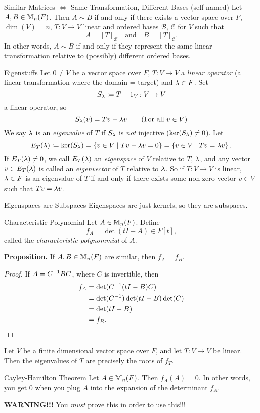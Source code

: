 \documentclass[class=article, crop=false]{standalone}
\begin{document}
  \begin{theorem}{Similar Matrices $\iff$ Same Transformation, Different Bases (self-named)}
    Let $A, B\in \mathbb{M}_n(F)$. Then $A\sim B$ if and only if there exists a vector space over $F$, $\dim(V) = n$, $T\colon V\to V$ linear and ordered bases $\mathcal{B}$, $\mathcal{C}$ for $V$ such that
    \[
      A = [T]_{\mathcal{B}}\quad \text{and} \quad B = [T]_{\mathcal{C}}.
    \]
    In other words, $A\sim B$ if and only if they represent the same linear transformation relative to (possibly) different ordered bases.
  \end{theorem}
  \begin{definition}{Eigenstuffs}
    Let $0\neq V$ be a vector space over $F$, $T\colon V\to V$ a \emph{linear operator} (a linear transformation where the domain = target) and $\lambda\in F$. Set
    \[
      S_{\lambda}\coloneqq T - 1_V\colon V\to V
    \]
    a linear operator, so
    \[
      S_{\lambda}(v) = Tv - \lambda v \tag{For all $v\in V$}
    \]
    We say $\lambda$ is an \emph{eigenvalue} of $T$ if $S_{\lambda}$ is \emph{not} injective ($\ker(S_{\lambda})\neq 0$).
    Let
    \[
      E_T(\lambda)\coloneqq \ker(S_{\lambda}) = \left\{v\in V\mid Tv - \lambda v = 0\right\} = \left\{v\in V\mid Tv = \lambda v\right\}.
    \]
    If $E_T(\lambda)\neq 0$, we call $E_T(\lambda)$ an \emph{eigenspace} of $V$ relative to $T$, $\lambda$, and any vector $v\in E_T(\lambda)$ is called an \emph{eigenvector} of $T$ relative to $\lambda$. So if $T\colon V\to V$ is linear, $\lambda\in F$ is an eigenvalue of $T$ if and only if there exists some non-zero vector $v\in V$ such that $Tv = \lambda v$.
  \end{definition}
  \begin{note}{Eigenspaces are Subspaces}
    Eigenspaces are just kernels, so they are subspaces.
  \end{note}
  \begin{definition}{Characteristic Polynomial}
    Let $A\in \mathbb{M}_n(F)$. Define
    \[
      f_A = \det(tI - A)\in F[t],
    \]
    called the \emph{characteristic polynommial} of $A$.
  \end{definition}
  \textbf{Proposition.} If $A, B\in \mathbb{M}_n(F)$ are similar, then $f_A = f_B$.
  \begin{proof}
    If $A = C^{-1} BC$, where $C$ is invertible, then 
    \begin{align*}
      f_A &= \det(C^{-1} (tI - B)C) \\
          &= \det(C^{-1})\det(tI-B)\det(C) \\
          &= \det(tI-B) \\
          &= f_B.
    \end{align*}
  \end{proof}
  \begin{theorem}{14.3}
    Let $V$ be a finite dimensional vector space over $F$, and let $T\colon V\to V$ be linear. Then the eigenvalues of $T$ are precisely the roots of $f_T$.
  \end{theorem}
  \begin{theorem}{Cayley-Hamilton Theorem}
    Let $A\in \mathbb{M}_n(F)$. Then $f_A(A) = 0$. In other words, you get $0$ when you plug $A$ into the expansion of the determinant $f_A$. \par
    \textbf{WARNING!!!} You \emph{must} prove this in order to use this!!!
  \end{theorem}
\end{document}
